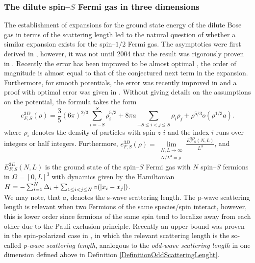 \subsubsection{The dilute spin--$ S $ Fermi gas in three dimensions}
The establishment of expansions for the ground state energy of the dilute Bose gas in terms of the scattering length led to the natural question of whether a similar expansion exists for the spin--$ 1/2 $ Fermi gas. The asymptotics were first derived in \cite{huang1957quantum,lee1957many}, however, it was not until 2004 that the result was rigorously proven in \cite{lieb2005ground}. Recently the error has been improved to be almost optimal \cite{lauritsen2023almost}, \ie the order of magnitude is almost equal to that of the conjectured next term in the expansion. Furthermore, for smooth potentials, the error was recently improved in  \cite{falconi2021dilute} and a proof with optimal error was given in \cite{giacomelli2022optimal}. Without giving details on the assumptions on the potential, the formula takes the form
\begin{equation}
e^{3D}_{F,S}(\rho)=\frac{3}{5}\left(6\pi\right)^{2/3}\sum_{i=-S}^{S}\rho_i^{5/3}+8\pi a\sum_{-S\leq i<j\leq S}\rho_i\rho_j+\rho^{5/3}o\left(\rho^{1/3}a\right).
\end{equation}
where $ \rho_i $ denotes the density of particles with spin-$ z $ $ i $ and the index $ i $ runs over integers or half integers. Furthermore, $ e^{3D}_{F,S}(\rho)=\lim\limits_{\substack{N,L\to\infty\\ N/L^3=\rho}}\frac{E^{3D}_{F,S}(N,L)}{L^3} $, and $ E^{3D}_{F,S}(N,L) $ is the ground state of the spin--$ S $ Fermi gas with $ N $ spin--$ S $ fermions in $ \Omega=[0,L]^3 $ with dynamics given by the Hamiltonian $ H=-\sum_{i=1}^{N}\Delta_i+\sum_{1\leq i<j\leq N} v(\left\lvert x_i-x_j \right\rvert) $.\\
We may note, that $ a $, denotes the s-wave scattering length. The p-wave scattering length is relevant when two Fermions of the same species/spin interact, however, this is lower order since fermions of the same spin tend to localize away from each other due to the Pauli exclusion principle. Recently an upper bound was proven in the spin-polarized case in \cite{lauritsen2023ground}, in which the relevant scattering length is the so-called \emph{p-wave scattering length}, analogous to the \emph{odd-wave scattering length} in one dimension defined above in Definition \ref{DefinitionOddScatteringLenght}.

